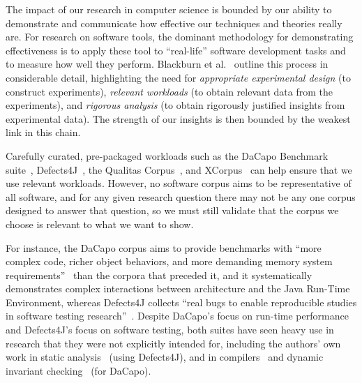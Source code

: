 The impact of our research in computer science is bounded by our
ability to demonstrate and communicate how effective our techniques
and theories really are.
%
%
For research on software tools, the dominant methodology for
demonstrating effectiveness is to apply these tool to ``real-life''
software development tasks and to measure how well they perform.
%
Blackburn et al.~\cite{blackburn2008wake} outline this process in
considerable detail, highlighting the need for
\emph{appropriate experimental design} (to construct experiments),
\emph{relevant  workloads} (to obtain relevant data from the experiments),
and
\emph{rigorous analysis} (to obtain rigorously justified insights from experimental data).
The strength of our insights is then bounded by the weakest link in
this chain.

Carefully curated, pre-packaged workloads such as
the DaCapo Benchmark suite~\cite{DaCapo:paper},
Defects4J~\cite{just2014defects4j},
the Qualitas Corpus~\cite{QualitasCorpus:APSEC:2010},
and XCorpus~\cite{dietrich2017xcorpus}
can help ensure that we use relevant workloads.
%
However, no software corpus aims to be representative of all software,
and for any given research question there may not be any one corpus designed to
answer that question,
so we must still
validate that the corpus we choose is relevant to what we want to show.

For instance, the DaCapo corpus aims to provide benchmarks with ``more complex
code, richer object behaviors, and more demanding memory system
requirements''~\cite{DaCapo:paper} than the corpora that preceded it,
and it systematically demonstrates
complex interactions between architecture and the Java Run-Time
Environment,
whereas
Defects4J collects ``real bugs to enable reproducible studies
in software testing research''~\cite{just2014defects4j}.
Despite DaCapo's focus on run-time performance and Defects4J's focus
on software testing, both suites
have seen heavy use in research that they were not explicitly intended for,
 including the authors' own work in
static analysis~\cite{riouak2021precise, dura2021javadl} (using Defects4J),
and in
compilers~\cite{ekman2007jastadd} and dynamic invariant checking~\cite{reichenbach2010can}
(for DaCapo).


